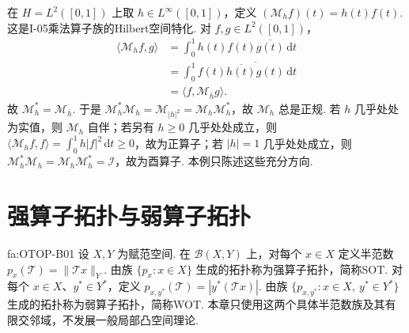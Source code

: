\begin{FAExample}\label{i11:mult-hilbert}
在 \(\displaystyle H=L^2([0,1])\) 上取 \(\displaystyle h\in L^\infty([0,1])\)，定义 \(\displaystyle (\mathcal M_hf)(t)=h(t)f(t)\). 这是I-05乘法算子族的Hilbert空间特化. 对 \(\displaystyle f,g\in L^2([0,1])\)，
\[
\begin{aligned}
\displaystyle \langle\mathcal M_hf,g\rangle
&\displaystyle =\int_0^1 h(t)f(t)\overline{g(t)}\,\mathrm{d}t\\
&\displaystyle =\int_0^1 f(t)\overline{\overline{h(t)}g(t)}\,\mathrm{d}t\\
&\displaystyle =\langle f,\mathcal M_{\overline h}g\rangle.
\end{aligned}
\]
故
\(\displaystyle \mathcal M_h^*=\mathcal M_{\overline h}\).
于是 \(\displaystyle \mathcal M_h^*\mathcal M_h=\mathcal M_{|h|^2}=\mathcal M_h\mathcal M_h^*\)，故 \(\displaystyle \mathcal M_h\) 总是正规. 若 \(\displaystyle h\) 几乎处处为实值，则 \(\displaystyle \mathcal M_h\) 自伴；若另有 \(\displaystyle h\geqslant0\) 几乎处处成立，则 \(\displaystyle \langle\mathcal M_hf,f\rangle=\int_0^1h|f|^2\,\mathrm{d}t\geqslant0\)，故为正算子；若 \(\displaystyle |h|=1\) 几乎处处成立，则 \(\displaystyle \mathcal M_h^*\mathcal M_h=\mathcal M_h\mathcal M_h^*=\mathcal I\)，故为酉算子. 本例只陈述这些充分方向.
\end{FAExample}

\section{强算子拓扑与弱算子拓扑}\label{sec:i11-operator-topologies}

\begin{FADefinition}[B][强/弱算子拓扑]{fa:OTOP-B01}
设 \(\displaystyle X,Y\) 为赋范空间. 在 \(\displaystyle \mathcal B(X,Y)\) 上，对每个 \(\displaystyle x\in X\) 定义半范数
\(\displaystyle p_x(\mathcal T)=\|\mathcal T x\|_Y\).
由族 \(\displaystyle \{p_x:x\in X\}\) 生成的拓扑称为强算子拓扑，简称SOT. 对每个 \(\displaystyle x\in X\)、\(\displaystyle y^*\in Y^*\)，定义
\(\displaystyle p_{x,y^*}(\mathcal T)=|y^*(\mathcal T x)|\).
由族 \(\displaystyle \{p_{x,y^*}:x\in X,\ y^*\in Y^*\}\) 生成的拓扑称为弱算子拓扑，简称WOT. 本章只使用这两个具体半范数族及其有限交邻域，不发展一般局部凸空间理论.
\end{FADefinition}

